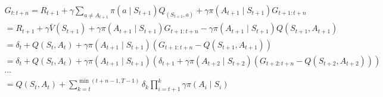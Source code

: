 \begin{align*}
    &G_{t:t+n} = R_{t+1} + \gamma \sum_{a \neq A_{t+1}} \pi(a \mid S_{t+1}) Q_(S_{t+1}, a) 
    + \gamma \pi(A_{t+1} \mid S_{t+1}) G_{t+1:t+n} \\
    &= R_{t+1} + \gamma \bar{V}(S_{t+1}) + \gamma \pi(A_{t+1} \mid S_{t+1}) G_{t+1:t+n} 
    - \gamma \pi(A_{t+1} \mid S_{t+1}) Q(S_{t+1}, A_{t+1}) \\
    &= \delta_t + Q(S_t, A_t)  + \gamma \pi(A_{t+1} \mid S_{t+1}) \left(G_{t+1:t+n} - Q(S_{t+1}, A_{t+1}) \right) \\
    &= \delta_t + Q(S_t, A_t)  + \gamma \pi(A_{t+1} \mid S_{t+1}) \left(\delta_{t+1}  + \gamma \pi(A_{t+2} \mid S_{t+2}) \left(G_{t+2:t+n} - Q(S_{t+2}, A_{t+2}) \right) \right)\\
    &\cdots \\
    &= Q(S_t, A_t) + \sum_{k=t}^{\min(t+n-1, T-1)} \delta_k \prod_{i=t+1}^k \gamma \pi(A_i \mid S_i)
\end{align*}
